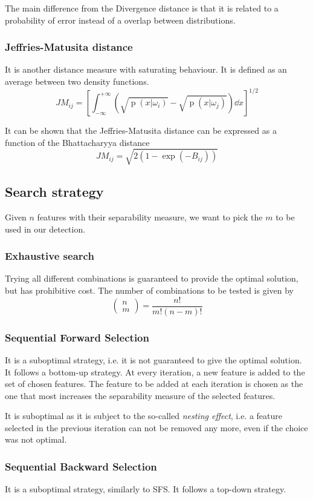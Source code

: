\documentclass[oneside,onecolumn]{report}
\DeclareMathOperator*{\pdf}{p}
\begin{document}
The main difference from the Divergence distance is that it is related to a probability of error instead of a overlap between distributions.

\subsubsection{Jeffries-Matusita distance}
It is another distance measure with saturating behaviour.
It is defined as an average between two density functions.
$$ JM_{ij} = \left[ \int_{-\infty}^{+\infty} \left( \sqrt{\pdf(x | \omega_i)} - \sqrt{\pdf(x | \omega_j)} \right) \dd x \right]^{1/2} $$

It can be shown that the Jeffries-Matusita distance can be expressed as a function of the Bhattacharyya distance
$$ JM_{ij} = \sqrt{2 (1 - \exp(-B_{ij}))} $$


\subsection{Search strategy}
Given $n$ features with their separability measure, we want to pick the $m$ to be used in our detection.

\subsubsection{Exhaustive search}
Trying all different combinations is guaranteed to provide the optimal solution, but has prohibitive cost.
The number of combinations to be tested is given by
$$ \begin{pmatrix} n \\ m \end{pmatrix} = \frac{n!}{m! (n - m)!} $$

\subsubsection{Sequential Forward Selection}
It is a suboptimal strategy, i.e. it is not guaranteed to give the optimal solution.
It follows a bottom-up strategy.
At every iteration, a new feature is added to the set of chosen features.
The feature to be added at each iteration is chosen as the one that most increases the separability measure of the selected features.

It is suboptimal as it is subject to the so-called \emph{nesting effect}, i.e. a feature selected in the previous iteration can not be removed any more, even if the choice was not optimal.

\subsubsection{Sequential Backward Selection}
It is a suboptimal strategy, similarly to SFS.
It follows a top-down strategy.
\end{document}
